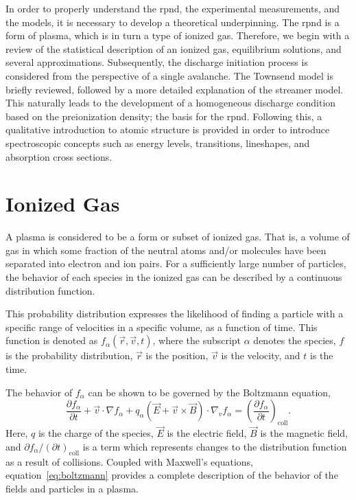 In order to properly understand the \acs{rpnd}, the experimental measurements,
and the models, it is necessary to develop a theoretical underpinning. The
\acs{rpnd} is a form of plasma, which is in turn a type of ionized gas.
Therefore, we begin with a review of the statistical description of an ionized
gas, equilibrium solutions, and several approximations. Subsequently, the
discharge initiation process is considered from the perspective of a single
avalanche. The Townsend model is briefly reviewed, followed by a more detailed
explanation of the streamer model. This naturally leads to the development of a
homogeneous discharge condition based on the preionization density; the basis
for the \acs{rpnd}. Following this, a qualitative introduction to atomic
structure is provided in order to introduce spectroscopic concepts such as
energy levels, transitions, lineshapes, and absorption cross sections.

\section{Ionized Gas}
A plasma is considered to be a form or subset of ionized gas. That is, a volume
of gas in which some fraction of the neutral atoms and/or molecules have been
separated into electron and ion pairs. For a sufficiently large number of
particles, the behavior of each species in the ionized gas can be described by a
continuous distribution function.

This probability distribution expresses the likelihood of finding a particle
with a specific range of velocities in a specific volume, as a function of time.
This function is denoted as $f_\alpha(\vec{r}, \vec{v}, t)$, where
the subscript $\alpha$ denotes the species, $f$ is the probability distribution,
$\vec{r}$ is the position, $\vec{v}$ is the velocity, and $t$ is the time.

The behavior of $f_\alpha$ can be shown to be governed by the Boltzmann
equation,
\begin{equation}\label{eq:boltzmann}
  \frac{\partial f_\alpha}{\partial t} + \vec{v}\cdot\nabla f_\alpha +
  q_\alpha \left(\vec{E} + \vec{v}\times\vec{B}\right)
  \cdot \nabla_v f_\alpha = \left( \frac{\partial f_\alpha}
  {\partial t}\right)_\mathrm{coll}.
\end{equation}
Here, $q$ is the charge of the species, $\vec{E}$ is the electric field,
$\vec{B}$ is the magnetic field, and $\partial f_\alpha/(\partial
t)_\mathrm{coll}$ is a term which represents changes to the distribution
function as a result of collisions. Coupled with Maxwell's equations,
equation~\ref{eq:boltzmann} provides a complete description of the behavior of
the fields and particles in a plasma.

